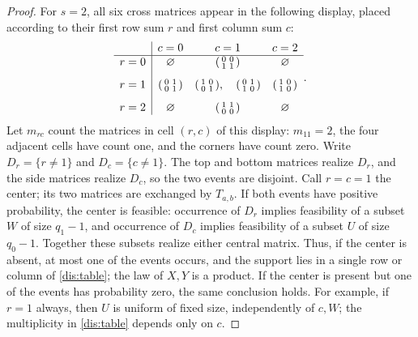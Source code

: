 \begin{proof}
For $s=2$, all six cross matrices appear in the following display,
placed according to their first row sum $r$ and first column sum $c$:
\begin{equation}\label{dis:table}
\begin{array}{c|ccc}
 &c=0&c=1&c=2\\ \hline
 r=0&\varnothing&
 \begin{psmallmatrix}0&0\\1&1\end{psmallmatrix}&\varnothing\\[8pt]
 r=1&\begin{psmallmatrix}0&1\\0&1\end{psmallmatrix}&
 \begin{psmallmatrix}1&0\\0&1\end{psmallmatrix},\quad
 \begin{psmallmatrix}0&1\\1&0\end{psmallmatrix}&
 \begin{psmallmatrix}1&0\\1&0\end{psmallmatrix}\\[8pt]
 r=2&\varnothing&
 \begin{psmallmatrix}1&1\\0&0\end{psmallmatrix}&\varnothing
\end{array}.
\end{equation}
Let $m_{rc}$ count the matrices in cell $(r,c)$ of this display:
$m_{11}=2$, the four adjacent cells have count one, and the corners
have count zero. Write $D_r=\{r\ne1\}$ and $D_c=\{c\ne1\}$.
The top and bottom matrices realize $D_r$, and the side matrices
realize $D_c$, so the two events are disjoint. Call $r=c=1$ the center;
its two matrices are exchanged by $T_{a,b}$. If both events have positive
probability, the center is feasible: occurrence of $D_r$ implies
feasibility of a subset $W$ of size $q_1-1$, and occurrence of $D_c$
implies feasibility of a subset $U$ of size $q_0-1$. Together these
subsets realize either central matrix. Thus, if the center is absent,
at most one of the events occurs, and the support lies in a single
row or column of \eqref{dis:table}; the law of $X,Y$ is a product.
If the center is present but one of the events has probability zero,
the same conclusion holds. For example, if $r=1$ always, then $U$ is
uniform of fixed size, independently of $c,W$; the multiplicity in
\eqref{dis:table} depends only on $c$.


\end{proof}
